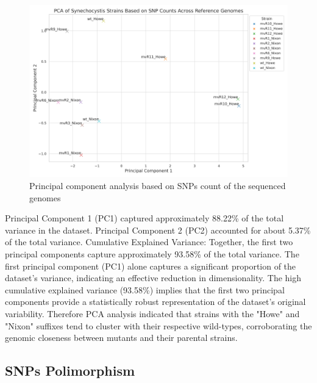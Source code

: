 \documentclass[12pt]{article}
\begin{document}
\begin{figure}[H]
    \centering
    \includegraphics[width=\hsize]{../Figures/MV_adaptation/PCA_Synechocystis_Strains_SNP_Counts.png}
    \caption{Principal component analysis based on SNPs count of the sequenced genomes}
    \label{fig:PCA}
\end{figure}

Principal Component 1 (PC1) captured approximately 88.22\% of the total variance in the dataset. Principal Component 2 (PC2) accounted for about 5.37\% of the total variance. Cumulative Explained Variance: Together, the first two principal components capture approximately 93.58\% of the total variance. The first principal component (PC1) alone captures a significant proportion of the dataset's variance, indicating an effective reduction in dimensionality. The high cumulative explained variance (93.58\%) implies that the first two principal components provide a statistically robust representation of the dataset's original variability.
Therefore PCA analysis indicated that strains with the "Howe" and "Nixon" suffixes tend to cluster with their respective wild-types, corroborating the genomic closeness between mutants and their parental strains.

\subsection{SNPs Polimorphism}
\end{document}
